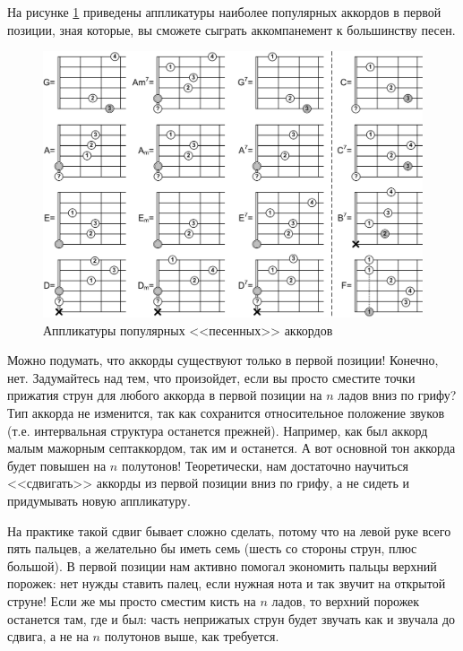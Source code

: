 На рисунке \ref{fig:harmony:chords:popular} приведены аппликатуры наиболее популярных аккордов в первой позиции, зная которые, вы сможете сыграть аккомпанемент к большинству песен.

\begin{figure}[!ht]
    \centering
    \includegraphics{fig/chords/popular} 
    \caption{Аппликатуры популярных <<песенных>> аккордов}\label{fig:harmony:chords:popular}
\end{figure} 

Можно подумать, что аккорды существуют только в первой позиции! Конечно, нет. Задумайтесь над тем, что произойдет, если вы просто сместите точки прижатия струн для любого аккорда в первой позиции на $n$ ладов вниз по грифу? Тип аккорда не изменится, так как сохранится относительное положение звуков (т.е. интервальная структура останется прежней). Например, как был аккорд малым мажорным септаккордом, так им и останется. А вот основной тон аккорда будет повышен на $n$ полутонов! Теоретически, нам достаточно научиться <<сдвигать>> аккорды из первой позиции вниз по грифу, а не сидеть и придумывать новую аппликатуру.

На практике такой сдвиг бывает сложно сделать, потому что на левой руке всего пять пальцев, а желательно бы иметь семь (шесть со стороны струн, плюс большой). В первой позиции нам активно помогал экономить пальцы верхний порожек: нет нужды ставить палец, если нужная нота и так звучит на открытой струне! Если же мы просто сместим кисть на $n$ ладов, то верхний порожек останется там, где и был: часть неприжатых струн будет звучать как и звучала до сдвига, а не на $n$ полутонов выше, как требуется.

